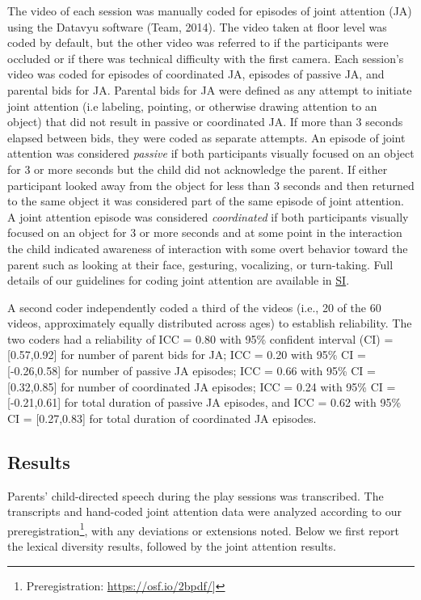 \documentclass[man,floatsintext]{apa6}
\let\rmarkdownfootnote\footnote%
\def\footnote{\protect\rmarkdownfootnote}
\begin{document}
The video of each session was manually coded for episodes of joint attention (JA) using the Datavyu software (Team, 2014).
The video taken at floor level was coded by default, but the other video was referred to if the participants were occluded or if there was technical difficulty with the first camera.
Each session's video was coded for episodes of coordinated JA, episodes of passive JA, and parental bids for JA.
Parental bids for JA were defined as any attempt to initiate joint attention (i.e labeling, pointing, or otherwise drawing attention to an object) that did not result in passive or coordinated JA.
If more than 3 seconds elapsed between bids, they were coded as separate attempts.
An episode of joint attention was considered \emph{passive} if both participants visually focused on an object for 3 or more seconds but the child did not acknowledge the parent.
If either participant looked away from the object for less than 3 seconds and then returned to the same object it was considered part of the same episode of joint attention.
A joint attention episode was considered \emph{coordinated} if both participants visually focused on an object for 3 or more seconds and at some point in the interaction the child indicated awareness of interaction with some overt behavior toward the parent such as looking at their face, gesturing, vocalizing, or turn-taking.
Full details of our guidelines for coding joint attention are available in \href{https://docs.google.com/document/d/1cZrT_Gjt6p0om19lXO-XcFnT09pb0giyhRQ-Pm1yoBU/edit?usp=sharing}{SI}.

A second coder independently coded a third of the videos (i.e., 20 of the 60 videos, approximately equally distributed across ages) to establish reliability.
The two coders had a reliability of ICC = 0.80 with 95\% confident interval (CI) = {[}0.57,0.92{]} for number of parent bids for JA; ICC = 0.20 with 95\% CI = {[}-0.26,0.58{]} for number of passive JA episodes; ICC = 0.66 with 95\% CI = {[}0.32,0.85{]} for number of coordinated JA episodes; ICC = 0.24 with 95\% CI = {[}-0.21,0.61{]} for total duration of passive JA episodes, and ICC = 0.62 with 95\% CI = {[}0.27,0.83{]} for total duration of coordinated JA episodes.

\hypertarget{results}{%
\subsection{Results}\label{results}}

Parents' child-directed speech during the play sessions was transcribed.
The transcripts and hand-coded joint attention data were analyzed according to our preregistration\footnote{Preregistration: \url{https://osf.io/2bpdf/}{]}}, with any deviations or extensions noted.
Below we first report the lexical diversity results, followed by the joint attention results.
\end{document}
